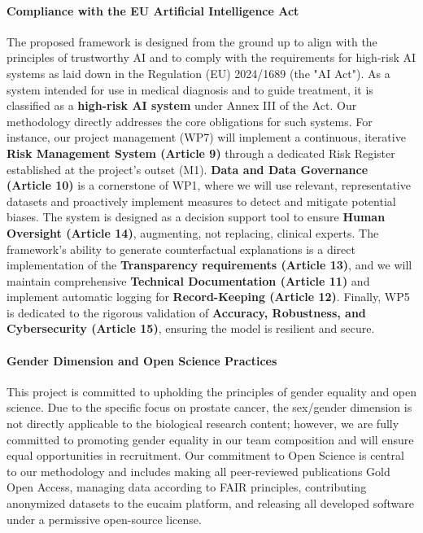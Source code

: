 \documentclass[11pt, a4paper]{article}
\begin{document}
\paragraph{Compliance with the EU Artificial Intelligence Act}
The proposed framework is designed from the ground up to align with the principles of trustworthy AI and to comply with the requirements for high-risk AI systems as laid down in the Regulation (EU) 2024/1689 (the "AI Act"). As a system intended for use in medical diagnosis and to guide treatment, it is classified as a \textbf{high-risk AI system} under Annex III of the Act. Our methodology directly addresses the core obligations for such systems. For instance, our project management (WP7) will implement a continuous, iterative \textbf{Risk Management System (Article 9)} through a dedicated Risk Register established at the project's outset (M1). \textbf{Data and Data Governance (Article 10)} is a cornerstone of WP1, where we will use relevant, representative datasets and proactively implement measures to detect and mitigate potential biases. The system is designed as a decision support tool to ensure \textbf{Human Oversight (Article 14)}, augmenting, not replacing, clinical experts. The framework's ability to generate counterfactual explanations is a direct implementation of the \textbf{Transparency requirements (Article 13)}, and we will maintain comprehensive \textbf{Technical Documentation (Article 11)} and implement automatic logging for \textbf{Record-Keeping (Article 12)}. Finally, WP5 is dedicated to the rigorous validation of \textbf{Accuracy, Robustness, and Cybersecurity (Article 15)}, ensuring the model is resilient and secure.

\paragraph{Gender Dimension and Open Science Practices}
This project is committed to upholding the principles of gender equality and open science. Due to the specific focus on prostate cancer, the sex/gender dimension is not directly applicable to the biological research content; however, we are fully committed to promoting gender equality in our team composition and will ensure equal opportunities in recruitment. Our commitment to Open Science is central to our methodology and includes making all peer-reviewed publications Gold Open Access, managing data according to FAIR principles, contributing anonymized datasets to the \gls{eucaim} platform, and releasing all developed software under a permissive open-source license.
\end{document}
